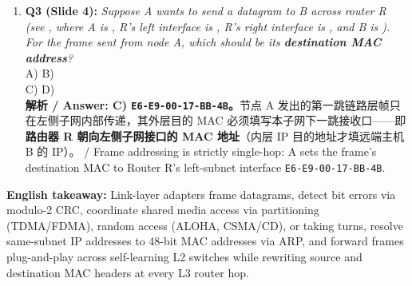 \begin{enumerate}
\item \textbf{Q3 (Slide 4):} \emph{Suppose A wants to send a datagram to B across router R (see , where A is , R's left interface is , R's right interface is , and B is ). For the frame sent from node A, which should be its \textbf{destination MAC address}?} \\
A)  \quad B)  \\
C)  \quad D)  \\
\textbf{解析 / Answer: C) \texttt{E6-E9-00-17-BB-4B}。}节点 A 发出的第一跳链路层帧只在左侧子网内部传递，其外层目的 MAC 必须填写本子网下一跳接收口——即\textbf{路由器 R 朝向左侧子网接口的 MAC 地址}（内层 IP 目的地址才填远端主机 B 的 IP）。 / Frame addressing is strictly single-hop: A sets the frame's destination MAC to Router R's left-subnet interface \texttt{E6-E9-00-17-BB-4B}.
\end{enumerate}

\textbf{English takeaway:} Link-layer adapters frame datagrams, detect bit errors via modulo-2 CRC, coordinate shared media access via partitioning (TDMA/FDMA), random access (ALOHA, CSMA/CD), or taking turns, resolve same-subnet IP addresses to 48-bit MAC addresses via ARP, and forward frames plug-and-play across self-learning L2 switches while rewriting source and destination MAC headers at every L3 router hop.



